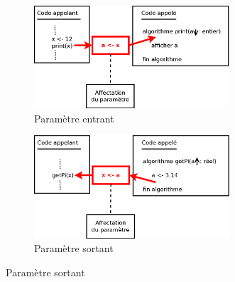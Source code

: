 \begin{center}
\begin{figure}
\begin{centering}
    \begin{subfigure}[b]{0.8\textwidth}
	\includegraphics[width=0.8\textwidth]{image/figure-parametres-entrants}
        \caption{Paramètre entrant}
        \label{fig:gull}
    \end{subfigure}
\par\end{centering}

\vspace{1cm}

\begin{centering}
    \begin{subfigure}[b]{0.8\textwidth}
	\includegraphics[width=0.8\textwidth]{image/figure-parametres-sortants}
        \caption{Paramètre sortant}
        \label{fig:gull}
    \end{subfigure}
\par\end{centering}

\vspace{1cm}


\end{figure}
\end{center}
